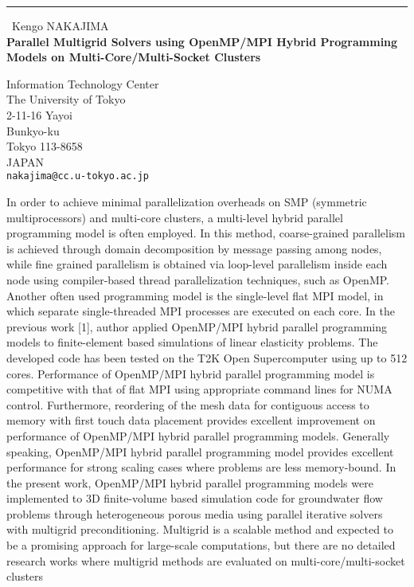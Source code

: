 \documentclass{report}
\begin{document}
\begin{center}
\rule{6in}{1pt} \
{\large Kengo NAKAJIMA \\
{\bf Parallel Multigrid Solvers using OpenMP/MPI Hybrid Programming Models on Multi-Core/Multi-Socket Clusters}}

Information Technology Center \\ The University of Tokyo \\ 2-11-16 Yayoi \\ Bunkyo-ku \\ Tokyo 113-8658 \\ JAPAN
\\
{\tt nakajima@cc.u-tokyo.ac.jp}\end{center}

In order to achieve minimal parallelization overheads on SMP (symmetric
multiprocessors) and multi-core clusters, a multi-level hybrid parallel
programming model is often employed. In this method, coarse-grained
parallelism is achieved through domain decomposition by message passing
among nodes, while fine grained parallelism is obtained via loop-level
parallelism inside each node using compiler-based thread parallelization
techniques, such as OpenMP. Another often used programming model is the
single-level flat MPI model, in which separate single-threaded MPI
processes are executed on each core. In the previous work [1], author
applied OpenMP/MPI hybrid parallel programming models to finite-element
based simulations of linear elasticity problems. The developed code has
been tested on the T2K Open Supercomputer using up to 512 cores.
Performance of OpenMP/MPI hybrid parallel programming model is
competitive with that of flat MPI using appropriate command lines for
NUMA control. Furthermore, reordering of the mesh data for contiguous
access to memory with first touch data placement provides excellent
improvement on performance of OpenMP/MPI hybrid parallel programming
models. Generally speaking, OpenMP/MPI hybrid parallel programming model
provides excellent performance for strong scaling cases where problems
are less memory-bound. In the present work, OpenMP/MPI hybrid parallel
programming models were implemented to 3D finite-volume based simulation
code for groundwater flow problems through heterogeneous porous media
using parallel iterative solvers with multigrid preconditioning.
Multigrid is a scalable method and expected to be a promising approach
for large-scale computations, but there are no detailed research works
where multigrid methods are evaluated on multi-core/multi-socket clusters
\end{document}
